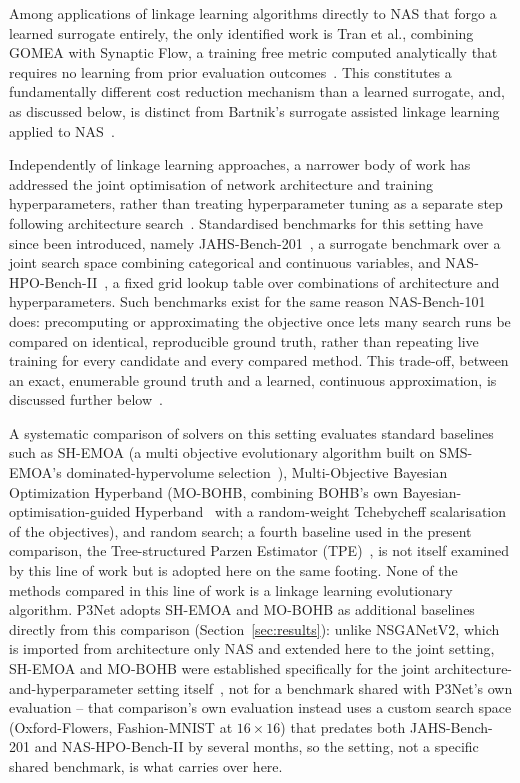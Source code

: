 Among applications of linkage learning algorithms directly to NAS that forgo a learned surrogate entirely, the only identified work is Tran et al., combining GOMEA with Synaptic Flow, a training free metric computed analytically that requires no learning from prior evaluation outcomes~\citep{tran2023gomeanas}. This constitutes a fundamentally different cost reduction mechanism than a learned surrogate, and, as discussed below, is distinct from Bartnik's surrogate assisted linkage learning applied to NAS~\citep{bartnik2026evolutionary}.

Independently of linkage learning approaches, a narrower body of work has addressed the joint optimisation of network architecture and training hyperparameters, rather than treating hyperparameter tuning as a separate step following architecture search~\citep{zela2018towards}. Standardised benchmarks for this setting have since been introduced, namely JAHS-Bench-201~\citep{bansal2022jahsbench}, a surrogate benchmark over a joint search space combining categorical and continuous variables, and NAS-HPO-Bench-II~\citep{hirose2021nashpobenchii}, a fixed grid lookup table over combinations of architecture and hyperparameters. Such benchmarks exist for the same reason NAS-Bench-101 does: precomputing or approximating the objective once lets many search runs be compared on identical, reproducible ground truth, rather than repeating live training for every candidate and every compared method. This trade-off, between an exact, enumerable ground truth and a learned, continuous approximation, is discussed further below~\citep{ying2019nasbench101}.

A systematic comparison of solvers on this setting evaluates standard baselines such as SH-EMOA (a multi objective evolutionary algorithm built on SMS-EMOA's dominated-hypervolume selection~\citep{beume2007smsemoa}), Multi-Objective Bayesian Optimization Hyperband (MO-BOHB, combining BOHB's own Bayesian-optimisation-guided Hyperband~\citep{falkner2018bohb} with a random-weight Tchebycheff scalarisation of the objectives), and random search; a fourth baseline used in the present comparison, the Tree-structured Parzen Estimator (TPE)~\citep{bergstra2011tpe}, is not itself examined by this line of work but is adopted here on the same footing. None of the methods compared in this line of work is a linkage learning evolutionary algorithm. P3Net adopts SH-EMOA and MO-BOHB as additional baselines directly from this comparison (Section~\ref{sec:results}): unlike NSGANetV2, which is imported from architecture only NAS and extended here to the joint setting, SH-EMOA and MO-BOHB were established specifically for the joint architecture-and-hyperparameter setting itself~\citep{guerreroviu2021bagofbaselines}, not for a benchmark shared with P3Net's own evaluation -- that comparison's own evaluation instead uses a custom search space (Oxford-Flowers, Fashion-MNIST at $16\times16$) that predates both JAHS-Bench-201 and NAS-HPO-Bench-II by several months, so the setting, not a specific shared benchmark, is what carries over here.

